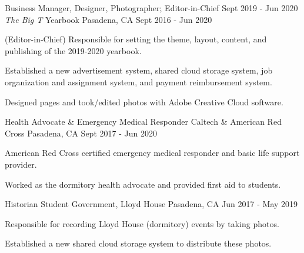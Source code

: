 

\begin{cventries}

  \cventry
    {Business Manager, Designer, Photographer; Editor-in-Chief Sept 2019 - Jun 2020}
    {\textit{The Big T} Yearbook}
    {Pasadena, CA} %
    {Sept 2016 - Jun 2020} %
    {
      \begin{cvitems}
        \item {(Editor-in-Chief) Responsible for setting the theme, layout, content, and publishing of the 2019-2020 yearbook.}
        \item {Established a new advertisement system, shared cloud storage system, job organization and assignment system, and payment reimbursement system.}
        \item {Designed pages and took/edited photos with Adobe Creative Cloud software.}
      \end{cvitems}
    }

  \cventry
    {Health Advocate \& Emergency Medical Responder} %
    {Caltech \& American Red Cross} %
    {Pasadena, CA} %
    {Sept 2017 - Jun 2020} %
    {
      \begin{cvitems} %
        \item {American Red Cross certified emergency medical responder and basic life support provider.}
        \item {Worked as the dormitory health advocate and provided first aid to students.}
      \end{cvitems}
    }

  \cventry
    {Historian} %
    {Student Government, Lloyd House} %
    {Pasadena, CA} %
    {Jun 2017 - May 2019} %
    {
      \begin{cvitems} %
        \item {Responsible for recording Lloyd House (dormitory) events by taking photos.}
        \item {Established a new shared cloud storage system to distribute these photos.}
      \end{cvitems}
    }

\end{cventries}
